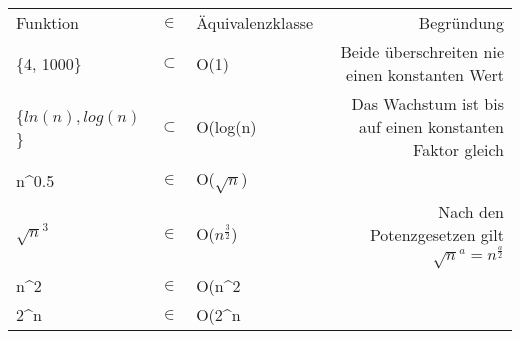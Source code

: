 \begin{tabular}{lcl|r}
Funktion		& $\in $ 	& Äquivalenzklasse & Begründung \\
\{4, 1000\}		& $\subset$ 	& O(1) 			& Beide überschreiten nie einen konstanten Wert \\
\{$ln(n), log(n)$\} 	& $\subset$	& O(log(n)		& Das Wachstum ist bis auf einen konstanten Faktor gleich \\
n^{0.5}			& $\in$		& O($\sqrt{n}$)		&	\\
$\sqrt{n}^{3}$		& $\in$		& O($n^{\frac{3}{2}}$)	& Nach den Potenzgesetzen gilt $\sqrt{n}^a = n ^{\frac{a}{2}} $\\
n^{2}			& $\in$		& O(n^2}		& \\
2^n			& $\in$		& O(2^n}		& \\
\end{tabular}


